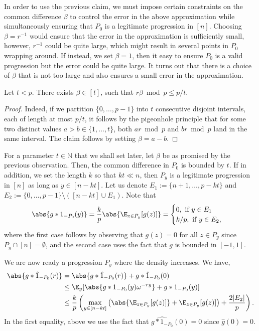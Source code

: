 \documentclass{article}
\begin{document}
In order to use the previous claim, we must impose certain constraints on the common difference $\beta$ to control the error in the above approximation while simultaneously ensuring that $P_0$ is a legitimate progression in $[n]$. Choosing $\beta = r^{-1}$ would ensure that the error in the approximation is sufficiently small, however, $r^{-1}$ could be quite large, which might result in several points in $P_0$ wrapping around. If instead, we set $\beta = 1$, then it easy to ensure $P_0$ is a valid progression but the error could be quite large. It turns out that there is a choice of $\beta$ that is not too large and also ensures a small error in the approximation.

\begin{obs}
Let $t < p$. There exists $\beta\in [t]$, such that $r\beta\bmod p \leq p/t$.
\end{obs}
\begin{proof}
Indeed, if we partition $\{0,\ldots,p-1\}$ into $t$ consecutive disjoint intervals, each of length at most $p/t$, it follows by the pigeonhole principle that for some two distinct values $a > b\in \{1,\ldots,t\}$, both $ar\bmod p$ and $br\bmod p$ land in the same interval. The claim follows by setting $\beta =  a-b$. 
\end{proof}   

For a parameter $t \in \mathbb{N}$ that we shall set later, let $\beta$ be as promised by the previous observation. Then, the common difference in $P_0$ is bounded by $t$. If in addition, we set the length $k$ so that $kt \ll n$, then $P_y$ is a legitimate progression in $[n]$ as long as $y \in [n-kt]$. Let us denote $E_1:= \{n+1,\ldots,p-kt\}$ and $E_2:= \{0,\ldots,p-1\}\setminus\left([n-kt]\cup E_1\right)$. Note that
\begin{align*}
    \abs{g\ast1_{-P_0}(y)} = \frac{k}{p}\abs{\E_{z\in P_y}[g(z)]} = \begin{cases} 0,\text{ if } y\in E_1\\ k/p, \text{ if } y\in E_2,\end{cases}
\end{align*}
where the first case follows by observing that $g(z) = 0$ for all $z\in P_y$ since $P_y\cap [n] = \emptyset$, and the second case uses the fact that $g$ is bounded in $[-1,1]$. 

We are now ready a progression $P_y$ where the density increases. We have,
\begin{align*}
     \abs{\hat{g\ast 1_{-P_0}}(r)} &= \abs{\hat{g\ast 1_{-P_0}}(r)} + \hat{g\ast 1_{-P_0}}(0) \\ 
     &\leq \E_y[\abs{g\ast 1_{-P_0}(y)\omega^{-ry}} + g\ast 1_{-P_0}(y)] \\ 
    &\leq \frac{k}{p}\left(\max_{y\in [n-kt]}\left(\abs{\E_{z\in P_y}[g(z)]} + \E_{z\in P_y}[g(z)]\right) + \frac{2|E_2|}{p}\right).
\end{align*}
In the first equality, above we use the fact that $\hat{g\ast 1_{-P_0}}(0) = 0$ since $\hat{g}(0) = 0$.  
\end{document}
